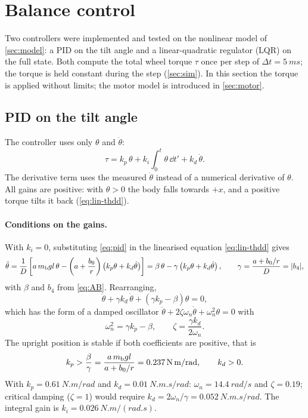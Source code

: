 \section{Balance control}\label{sec:control}

Two controllers were implemented and tested on the nonlinear model of
\cref{sec:model}: a PID on the tilt angle and a linear-quadratic regulator
(LQR) on the full state. Both compute the total wheel torque $\tau$ once per
step of $\Delta t = \SI{5}{ms}$; the torque is held constant during the step
(\cref{sec:sim}). In this section the torque is applied without limits; the
motor model is introduced in \cref{sec:motor}.

\subsection{PID on the tilt angle}

The controller uses only $\theta$ and $\dot\theta$:
\begin{equation}
  \tau = k_p\,\theta + k_i\int_0^t \theta\,\dd t' + k_d\,\dot\theta .
  \label{eq:pid}
\end{equation}
The derivative term uses the measured $\dot\theta$ instead of a numerical
derivative of $\theta$. All gains are positive: with $\theta > 0$ the body
falls towards $+x$, and a positive torque tilts it back (\cref{eq:lin-thdd}).

\paragraph{Conditions on the gains.} With $k_i = 0$, substituting
\cref{eq:pid} in the linearised equation \cref{eq:lin-thdd} gives
\begin{equation}
  \ddot\theta = \frac{1}{D}\left[a\,m_{\mathrm b} g l\,\theta
      - \left(a + \frac{b_0}{r}\right)\left(k_p\theta + k_d\dot\theta\right)\right]
  = \beta\,\theta - \gamma\left(k_p\theta + k_d\dot\theta\right),
  \qquad \gamma = \frac{a + b_0/r}{D} = |b_4| ,
\end{equation}
with $\beta$ and $b_4$ from \cref{eq:AB}. Rearranging,
\begin{equation}
  \ddot\theta + \gamma k_d\,\dot\theta + \left(\gamma k_p - \beta\right)\theta = 0 ,
\end{equation}
which has the form of a damped oscillator
$\ddot\theta + 2\zeta\omega_n\dot\theta + \omega_n^2\theta = 0$ with
\begin{equation}
  \omega_n^2 = \gamma k_p - \beta , \qquad \zeta = \frac{\gamma k_d}{2\omega_n} .
\end{equation}
The upright position is stable if both coefficients are positive, that is
\begin{equation}
  k_p > \frac{\beta}{\gamma} = \frac{a\,m_{\mathrm b} g l}{a + b_0/r} = \SI{0.237}{N.m/rad},
  \qquad k_d > 0 .
\end{equation}
With $k_p = \SI{0.61}{N.m/rad}$ and $k_d = \SI{0.01}{N.m.s/rad}$:
$\omega_n = \SI{14.4}{rad/s}$ and $\zeta = 0.19$; critical damping
($\zeta = 1$) would require $k_d = 2\omega_n/\gamma = \SI{0.052}{N.m.s/rad}$.
The integral gain is $k_i = \SI{0.026}{N.m/(rad.s)}$.

